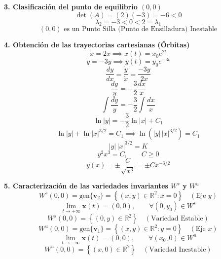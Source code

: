 \documentclass[11pt,a4paper]{article}
\newenvironment{solucion}[1][Solución Detallada]{%
    \vspace{1.5mm}%
    \noindent{\large\textbf{Solución:}}\par\vspace{1.5mm}%
}{%
    \par\vspace{3mm}%
}
\begin{document}
\begin{solucion}
\vspace{3.5mm}

\textbf{\large 3. Clasificación del punto de equilibrio $(0,0)$}
\[
\det(A) = (2)(-3) = -6 < 0
\]
\[
\lambda_2 = -3 < 0 < 2 = \lambda_1
\]
\[
\boxed{(0,0) \text{ es un Punto Silla (Punto de Ensilladura) Inestable}}
\]

\vspace{3.5mm}

\textbf{\large 4. Obtención de las trayectorias cartesianas (Órbitas)}
\[
\dot{x} = 2x \implies x(t) = x_0 e^{2t}
\]
\[
\dot{y} = -3y \implies y(t) = y_0 e^{-3t}
\]
\[
\frac{dy}{dx} = \frac{\dot{y}}{\dot{x}} = \frac{-3y}{2x}
\]
\[
\frac{dy}{y} = -\frac{3}{2}\frac{dx}{x}
\]
\[
\int \frac{dy}{y} = -\frac{3}{2}\int \frac{dx}{x}
\]
\[
\ln|y| = -\frac{3}{2}\ln|x| + C_1
\]
\[
\ln|y| + \ln|x|^{3/2} = C_1 \implies \ln\left(|y|\,|x|^{3/2}\right) = C_1
\]
\[
|y|\,|x|^{3/2} = K
\]
\[
\boxed{y^2 x^3 = C, \qquad C \ge 0}
\]
\[
\boxed{y(x) = \pm \frac{C}{\sqrt{x^3}} = \pm C x^{-3/2}}
\]

\vspace{3.5mm}

\textbf{\large 5. Caracterización de las variedades invariantes $W^s$ y $W^u$}
\[
W^s(0,0) = \mathrm{gen}\{\mathbf{v}_2\} = \left\{ (x, y) \in \mathbb{R}^2 : x = 0 \right\} \quad (\text{Eje } y)
\]
\[
\lim_{t \to +\infty} \mathbf{x}(t) = (0, 0), \qquad \forall (0, y_0) \in W^s
\]
\[
\boxed{W^s(0,0) = \left\{ (0, y) \in \mathbb{R}^2 \right\} \quad (\text{Variedad Estable})}
\]
\[
W^u(0,0) = \mathrm{gen}\{\mathbf{v}_1\} = \left\{ (x, y) \in \mathbb{R}^2 : y = 0 \right\} \quad (\text{Eje } x)
\]
\[
\lim_{t \to -\infty} \mathbf{x}(t) = (0, 0), \qquad \forall (x_0, 0) \in W^u
\]
\[
\boxed{W^u(0,0) = \left\{ (x, 0) \in \mathbb{R}^2 \right\} \quad (\text{Variedad Inestable})}
\]

\begin{center}
\end{center}
\end{solucion}
\end{document}
